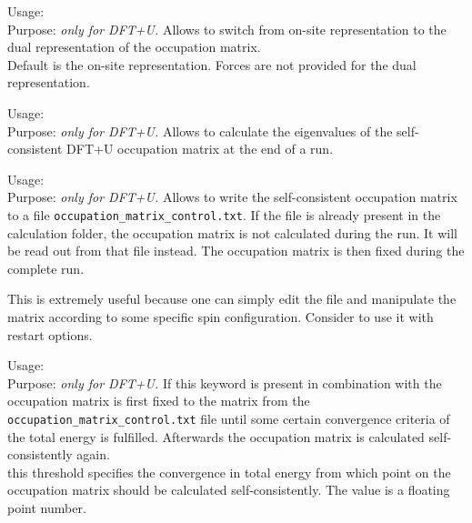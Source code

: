 {
  \noindent
  Usage:  \\[1.0ex]
  Purpose: \emph{only for DFT+U.} Allows to switch from on-site representation
     to the dual representation of the occupation matrix. \\[1.0ex] 
     Default is the on-site representation. Forces are not provided for
     the dual representation. \\ 
}

{
  \noindent
  Usage:  \\[1.0ex]
  Purpose: \emph{only for DFT+U.} Allows to calculate the eigenvalues
     of the self-consistent DFT+U occupation matrix at the end of 
     a run.\\ 
}

{
  \noindent
  Usage:  \\[1.0ex]
  Purpose: \emph{only for DFT+U.} Allows to write the self-consistent
     occupation matrix to a file \texttt{occupation\_matrix\_control.txt}.
     If the file is already present in the calculation folder, the occupation
     matrix is not calculated during the run. It will be read out from that file
     instead. The occupation matrix is then fixed during the complete run.\\ 
}

This is extremely useful because one can simply edit the file and manipulate the matrix according to
some specific spin configuration. Consider to use it with restart options.

{
  \noindent
  Usage:   \\[1.0ex]
  Purpose: \emph{only for DFT+U.} If this keyword is present in combination with  
     the occupation matrix is first fixed to the matrix from the \texttt{occupation\_matrix\_control.txt}
     file until some certain convergence criteria of the total energy is fulfilled. Afterwards
     the occupation matrix is calculated self-consistently again. \\[1.0ex]
      this threshold specifies the convergence in total energy
     from which point on the occupation matrix should be calculated self-consistently.
     The value is a floating point number. \\
}

